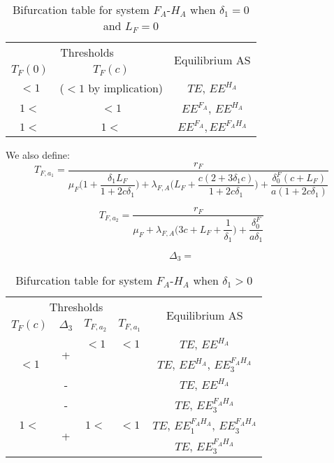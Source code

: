 \documentclass{article}
\newcommand{\lfa}{\lambda_{F, A}}
\newcommand{\df}{\delta_0^F}
\begin{document}
\begin{table}[!ht]
\centering
\caption{Bifurcation table for system $F_A$-$H_A$ when $\delta_1 = 0$ and $L_F = 0$}
\label{modelFAHA:bifurcation table, delta1=0, LF = 0}
\begin{tabular}{c|c|c}
\multicolumn{2}{c|}{Thresholds} & \multirow{2}{*}{Equilibrium AS}\\
$T_F(0)$ & $T_F(c)$ &\\
\hline
$<1$ & ($<1$ by implication) & $TE$, $EE^{H_A}$ \\
\hline
$1<$ & $<1$ & $EE^{F_A}$, $EE^{H_A}$ \\
\hline
$1<$ & $1<$ & $EE^{F_A}, EE^{F_AH_A}$ \\
\end{tabular}
\end{table}



We also define:
$$
T_{F, a_1} = \dfrac{r_F}{\mu_F\Big(1 + \dfrac{\delta_1 L_F}{1+2c\delta_1}\Big) + \lfa \Big(L_F + \dfrac{c(2+3\delta_1 c)}{1 + 2 c\delta_1}\Big) + \dfrac{\df (c+L_F)}{a(1+2c \delta_1)}}
$$

$$
T_{F, a_2} = \dfrac{r_F}{\mu_F + \lfa \Big(3c + L_F + \dfrac{1}{\delta_1}\Big) + \dfrac{\df}{a\delta_1}}
$$

$$
\Delta_3 = 
$$

\begin{table}[!ht]
\centering
\caption{Bifurcation table for system $F_A$-$H_A$ when $\delta_1 > 0$}
\label{modelFAHA:bifurcation table, delta1 > 0}
\begin{tabular}{c|c|c|c|c}
\multicolumn{4}{c|}{Thresholds} & \multirow{2}{*}{Equilibrium AS}\\
$T_F(c)$ & $\Delta_3$ & $T_{F, a_2}$ & $T_{F, a_1}$ &\\
\hline
\multirow{3}{*}{$<1$} & \multirow{2}{*}{+} & $<1$ & $<1$&  $TE$, $EE^{H_A}$ \\
\cline{3-5}
 &  & & & $TE$, $EE^{H_A}$, $EE^{F_AH_A}_3$ \\
 \cline{2-5}
 & - & & &  $TE$, $EE^{H_A}$ \\
\hline
\multirow{3}{*}{$1<$} & - & & &  $TE$, $EE^{F_AH_A}_3$ \\
\cline{2-5}
& \multirow{2}{*}{+} & $1<$ & $<1$ &  $TE$, $EE^{F_AH_A}_1$, $EE^{F_AH_A}_3$ \\
\cline{3-5}
 & &  & &  $TE$, $EE^{F_AH_A}_3$ \\
 \hline
\end{tabular}
\end{table} 
\end{document}
